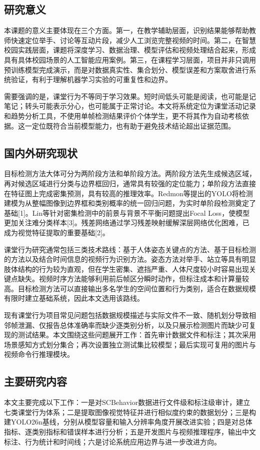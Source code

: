 \documentclass[12pt,hyperref,a4paper,UTF8]{ctexart}
\begin{document}
\subsection{研究意义}
本课题的意义主要体现在三个方面。第一，在教学辅助层面，识别结果能够帮助教师快速定位举手、讨论等互动片段，减少人工浏览完整视频的时间。第二，在智慧校园实践层面，课题将深度学习、数据治理、模型评估和视频处理结合起来，形成具有具体校园场景的人工智能应用案例。第三，在课程学习层面，项目并非只调用预训练模型完成演示，而是对数据真实性、集合划分、模型误差和方案取舍进行系统验证，有利于理解机器学习实验的可重复性和边界。\par
需要强调的是，课堂行为不等同于学习效果。短时间低头可能是阅读，也可能是记笔记；转头可能表示分心，也可能属于正常讨论。本文将系统定位为课堂活动记录和趋势分析工具，不使用单帧检测结果评价个体学生，更不将其作为自动考核依据。这一定位既符合当前模型能力，也有助于避免技术结论超出证据范围。\par
\subsection{国内外研究现状}
目标检测方法大体可分为两阶段方法和单阶段方法。两阶段方法先生成候选区域，再对候选区域进行分类与边界框回归，通常具有较强的定位能力；单阶段方法直接在特征图上完成密集预测，具有较高的推理效率。Redmon等提出的YOLO将检测建模为从整幅图像到边界框和类别概率的统一回归问题，为实时单阶段检测奠定了基础[1]。Lin等针对密集检测中的前景与背景不平衡问题提出Focal Loss，使模型更加关注难分类样本[3]。残差网络通过学习残差映射缓解深层网络优化困难，已成为视觉特征提取的重要基础[2]。\par
课堂行为研究通常包括三类技术路线：基于人体姿态关键点的方法、基于目标检测的方法以及结合时间信息的视频行为识别方法。姿态方法对举手、站立等具有明显肢体结构的行为较为直观，但在学生密集、遮挡严重、人体尺度较小时容易出现关键点缺失。视频时序方法能够利用前后帧区分瞬时动作，但标注成本和计算量较高。目标检测方法可以直接输出多名学生的空间位置和行为类别，适合在数据规模有限时建立基础系统，因此本文选用该路线。\par
现有课堂行为项目常见问题包括数据规模描述与实际文件不一致、随机划分导致相邻帧泄漏、仅报告总体准确率而缺少逐类别分析，以及只展示检测图片而缺少可复现的测试结果。本文围绕这些问题展开工作：首先审计数据文件和标注；其次采用场景感知方式划分集合；再次设置独立测试集比较模型；最后实现可复用的图片与视频命令行推理模块。\par
\subsection{主要研究内容}
本文主要完成以下工作：一是对SCBehavior数据进行文件级和标注级审计，建立七类课堂行为体系；二是提取图像视觉特征并进行相似度约束的数据划分；三是构建YOLO26n基线，分别从模型容量和输入分辨率角度开展改进实验；四是对总体指标、逐类别指标和错误样本进行分析；五是开发图片与视频推理程序，输出中文标注、行为统计和时间线；六是讨论系统应用边界与进一步改进方向。\par
\end{document}
